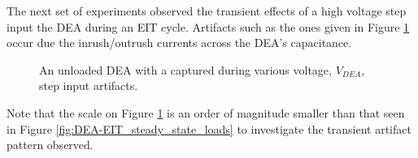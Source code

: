 The next set of experiments observed the transient effects of a high voltage step input the DEA during an EIT cycle. Artifacts such as the ones given in Figure \ref{fig:DEA-EIT_transients} occur due the inrush/outrush currents across the DEA's capacitance. 
\begin{figure}[H]
	\centering
	\hspace{0.2cm}
	\vspace{0.3cm}
	\caption{An unloaded DEA with a captured during various voltage, $V_{DEA}$, step input artifacts.}
	\label{fig:DEA-EIT_transients}
\end{figure}
Note that the scale on Figure \ref{fig:DEA-EIT_transients} is an order of magnitude smaller than that seen in Figure \ref{fig:DEA-EIT_steady_state_loads} to investigate the transient artifact pattern observed.

